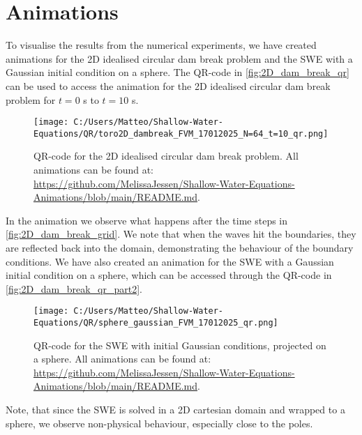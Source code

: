 \section{Animations}
To visualise the results from the numerical experiments, we have created animations for the 2D idealised circular dam break problem and the SWE with a Gaussian initial condition on a sphere.
The QR-code in \autoref{fig:2D_dam_break_qr} can be used to access the animation for the 2D idealised circular dam break problem for $t=0$ s to $t = 10$ s.
\begin{figure}[H]
    \centering
    \texttt{[image: C:/Users/Matteo/Shallow-Water-Equations/QR/toro2D\_dambreak\_FVM\_17012025\_N=64\_t=10\_qr.png]}
    \caption{QR-code for the 2D idealised circular dam break problem.
            All animations can be found at: \url{https://github.com/MelissaJessen/Shallow-Water-Equations-Animations/blob/main/README.md}.}\label{fig:2D_dam_break_qr}
\end{figure}
In the animation we observe what happens after the time steps in \autoref{fig:2D_dam_break_grid}.
We note that when the waves hit the boundaries, they are reflected back into the domain, demonstrating the behaviour of the boundary conditions.
We have also created an animation for the SWE with a Gaussian initial condition on a sphere, which can be accessed through the QR-code in \autoref{fig:2D_dam_break_qr_part2}.
\begin{figure}[H]
    \centering
    \texttt{[image: C:/Users/Matteo/Shallow-Water-Equations/QR/sphere\_gaussian\_FVM\_17012025\_qr.png]}
    \caption{QR-code for the SWE with initial Gaussian conditions, projected on a sphere.
            All animations can be found at: \url{https://github.com/MelissaJessen/Shallow-Water-Equations-Animations/blob/main/README.md}.}\label{fig:2D_dam_break_qr_part2}
\end{figure}
Note, that since the SWE is solved in a 2D cartesian domain and wrapped to a sphere, we observe non-physical behaviour, especially close to the poles.


